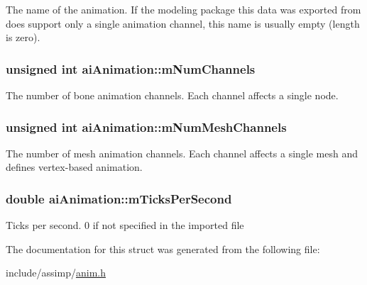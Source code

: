\-The name of the animation. \-If the modeling package this data was exported from does support only a single animation channel, this name is usually empty (length is zero). \hypertarget{structaiAnimation_aebfccf9a9aefa6084566d21e8a30b7e5}{
\subsubsection[{m\-Num\-Channels}]{\setlength{\rightskip}{0pt plus 5cm}unsigned int {\bf ai\-Animation\-::m\-Num\-Channels}}}\label{structaiAnimation_aebfccf9a9aefa6084566d21e8a30b7e5}
\-The number of bone animation channels. \-Each channel affects a single node. \hypertarget{structaiAnimation_ac43aacd8502020174e553501f0b6bf5f}{
\subsubsection[{m\-Num\-Mesh\-Channels}]{\setlength{\rightskip}{0pt plus 5cm}unsigned int {\bf ai\-Animation\-::m\-Num\-Mesh\-Channels}}}\label{structaiAnimation_ac43aacd8502020174e553501f0b6bf5f}
\-The number of mesh animation channels. \-Each channel affects a single mesh and defines vertex-\/based animation. \hypertarget{structaiAnimation_afd26a40c3f16b6aa6e150effa3eaeab1}{
\subsubsection[{m\-Ticks\-Per\-Second}]{\setlength{\rightskip}{0pt plus 5cm}double {\bf ai\-Animation\-::m\-Ticks\-Per\-Second}}}\label{structaiAnimation_afd26a40c3f16b6aa6e150effa3eaeab1}
\-Ticks per second. 0 if not specified in the imported file 

\-The documentation for this struct was generated from the following file\-:\begin{DoxyCompactItemize}
\item 
include/assimp/\hyperlink{anim_8h}{anim.\-h}\end{DoxyCompactItemize}
